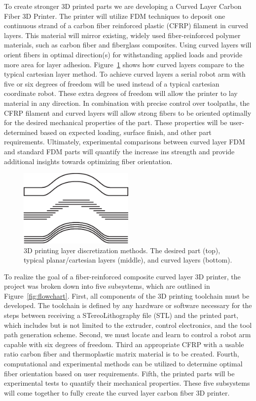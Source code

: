 To create stronger 3D printed parts we are developing a Curved Layer Carbon Fiber 3D Printer. The printer will utilize FDM techniques to deposit one continuous strand of a carbon fiber reinforced plastic (CFRP) filament in curved layers. This material will mirror existing, widely used fiber-reinforced polymer materials, such as carbon fiber and fiberglass composites. Using curved layers will orient fibers in optimal direction(s) for withstanding applied loads and provide more area for layer adhesion. Figure~\ref{fig:layers} shows how curved layers compare to the typical cartesian layer method. To achieve curved layers a serial robot arm with five or six degrees of freedom will be used instead of a typical cartesian coordinate robot. These extra degrees of freedom will allow the printer to lay material in any direction. In combination with precise control over toolpaths, the CFRP filament and curved layers will allow strong fibers to be oriented optimally for the desired mechanical properties of the part. These properties will be user-determined based on expected loading, surface finish, and other part requirements. Ultimately, experimental comparisons between curved layer FDM and standard FDM parts will quantify the increase ins strength and provide additional insights towards optimizing fiber orientation.\\

\begin{figure}[htp]
\centering
\includegraphics[width=0.5\textwidth]{./figures/layer-methods}
\caption{3D printing layer discretization methods. The desired part (top), typical planar/cartesian layers (middle), and curved layers (bottom).}
\label{fig:layers}
\end{figure}

To realize the goal of a fiber-reinforced composite curved layer 3D printer, the project was broken down into five subsystems, which are outlined in Figure~\ref{fig:flowchart}. First, all components of the 3D printing toolchain must be developed. The toolchain is defined by any hardware or software necessary for the steps between receiving a STereoLithography file (STL) and the printed part, which includes but is not limited to the extruder, control electronics, and the tool path generation scheme. Second, we must locate and learn to control a robot arm capable with six degrees of freedom. Third an appropriate CFRP with a usable ratio carbon fiber and thermoplastic matrix material is to be created. Fourth, computational and experimental methods can be utilized to determine optimal fiber orientation based on user requirements. Fifth, the printed parts will be experimental tests to quantify their mechanical properties. These five subsystems will come together to fully create the curved layer carbon fiber 3D printer.

